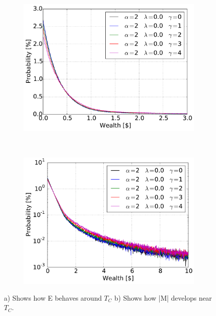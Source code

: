 \begin{figure}[H]
    \centering
    \begin{subfigure}{0.5\textwidth}
        \centering
        \includegraphics[width=\linewidth]{result/bilder/5e-2-00}
        \caption{}
    \end{subfigure}%
    ~ 
    \begin{subfigure}{0.5\textwidth}
        \centering
        \includegraphics[width=\linewidth]{result/bilder/5e-2-00-log}
        \caption{}
    \end{subfigure}
    \caption{a) Shows how E behaves around $T_C$ b) Shows how |M| develops near $T_C$.}
    \label{fig:5e-2-00}
\end{figure}














